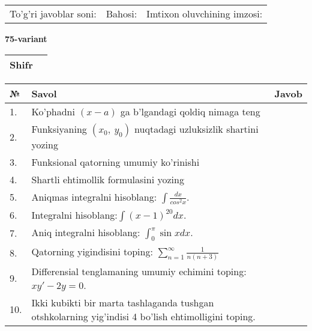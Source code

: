 \documentclass{article}
\begin{document}
  \vspace{1cm}
  
  \begin{tabular}{lll}
  To'g'ri javoblar soni: \underline{\hspace{1.5cm}} & 
  Bahosi: \underline{\hspace{1.5cm}} & 
  Imtixon oluvchining imzosi: \underline{\hspace{2cm}} \\
  \end{tabular}
  
  \egroup
  
  \newpage
  
  
  \textbf{75-variant}\\
  
  \bgroup
  \def\arraystretch{1.6} %
  
  \begin{tabular}{|m{5.7cm}|m{9.5cm}|}
  \hline
  Shifr & \\
  \hline
  \end{tabular}
  
  \vspace{1cm}
  
  \begin{tabular}{|m{0.7cm}|m{10cm}|m{4cm}|}
  \hline
  № & Savol & Javob \\
  \hline
  1. & Ko'phadni \((x - a)\) ga b'lgandagi qoldiq nimaga teng &  \\
  \hline
  2. & Funksiyaning \((x_{0},\ y_{0})\) nuqtadagi uzluksizlik shartini yozing &  \\
  \hline
  3. & Funksional qatorning umumiy ko'rinishi &  \\
  \hline
  4. & Shartli ehtimollik formulasini yozing &  \\
  \hline
  5. & Aniqmas integralni hisoblang: \(\int \frac{dx}{cos^{2}x}\). &  \\
  \hline
  6. & Integralni hisoblang:\(\int {(x - 1)^{20}}dx\). &  \\
  \hline
  7. & Aniq integralni hisoblang: \(\int_{0}^{\pi}{\sin xdx}\). &  \\
  \hline
  8. & Qatorning yigindisini toping: \(\sum_{n = 1}^{\infty}\frac{1}{n(n + 3)}\) &  \\
  \hline
  9. & Differensial tenglamaning umumiy echimini toping: \(xy' - 2y = 0\). &  \\
  \hline
  10. & Ikki kubikti bir marta tashlaganda tushgan otshkolarning yig'indisi 4 bo'lish ehtimolligini toping. &  \\
  \hline
  \end{tabular}
  
\end{document}
